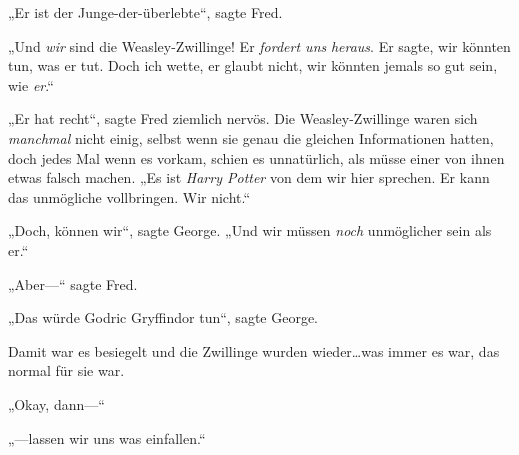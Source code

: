 „Er ist der Junge-der-überlebte“, sagte Fred.

„Und \emph{wir} sind die Weasley-Zwillinge! Er \emph{fordert uns} \emph{heraus}. Er sagte, wir könnten tun, was er tut. Doch ich wette, er glaubt nicht, wir könnten jemals so gut sein, wie \emph{er}.“

„Er hat recht“, sagte Fred ziemlich nervös. Die Weasley-Zwillinge waren sich \emph{manchmal} nicht einig, selbst wenn sie genau die gleichen Informationen hatten, doch jedes Mal wenn es vorkam, schien es unnatürlich, als müsse einer von ihnen etwas falsch machen. „Es ist \emph{Harry Potter} von dem wir hier sprechen. Er kann das unmögliche vollbringen. Wir nicht.“

„Doch, können wir“, sagte George. „Und wir müssen \emph{noch} unmöglicher sein als er.“

„Aber—“ sagte Fred.

„Das würde Godric Gryffindor tun“, sagte George.

Damit war es besiegelt und die Zwillinge wurden wieder…was immer es war, das normal für sie war.

„Okay, dann—“

„—lassen wir uns was einfallen.“


